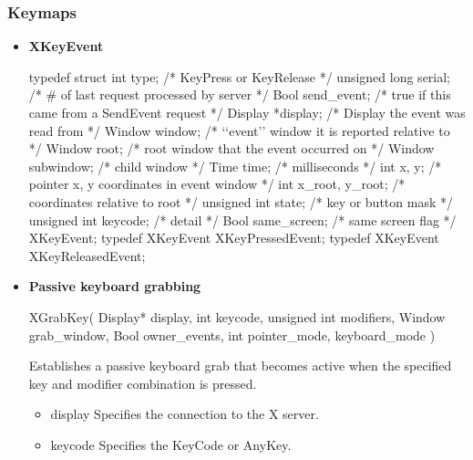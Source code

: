 \documentclass{report}
\begin{document}
    \subsubsection{Keymaps}
    \begin{itemize}
        \item \textbf{XKeyEvent} 
            \bigbreak \noindent 
            \begin{cppcode}
                typedef struct {
                    int type;               /* KeyPress or KeyRelease */
                    unsigned long serial;   /* # of last request processed by server */
                    Bool send_event;        /* true if this came from a SendEvent request */
                    Display *display;       /* Display the event was read from */
                    Window window;          /* ‘‘event’’ window it is reported relative to */
                    Window root;            /* root window that the event occurred on */
                    Window subwindow;       /* child window */
                    Time time;              /* milliseconds */
                    int x, y;               /* pointer x, y coordinates in event window */
                    int x_root, y_root;     /* coordinates relative to root */
                    unsigned int state;     /* key or button mask */
                    unsigned int keycode;   /* detail */
                    Bool same_screen;       /* same screen flag */
                } XKeyEvent;
                typedef XKeyEvent XKeyPressedEvent;
                typedef XKeyEvent XKeyReleasedEvent;
            \end{cppcode}
        \item \textbf{Passive keyboard grabbing}
            \bigbreak \noindent 
            \begin{cppcode}
                XGrabKey(
                    Display* display,
                    int keycode,
                    unsigned int modifiers,
                    Window grab_window,
                    Bool owner_events,
                    int pointer_mode, keyboard_mode
                )
            \end{cppcode}
            \bigbreak \noindent
            Establishes a passive keyboard grab that becomes active when the specified key and modifier combination is pressed.
            \begin{itemize}
                \item display Specifies the connection to the X server.
                \item keycode Specifies the KeyCode or AnyKey.

\end{itemize}
\end{itemize}
\end{document}
